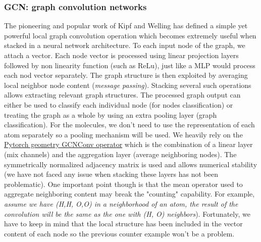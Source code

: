 \subsubsection{GCN: graph convolution networks}
\label{sec:GCN}

The pioneering and popular work of Kipf and Welling \cite{kipfwellinggcn} has defined a simple yet powerful local graph convolution operation which becomes extremely useful when stacked in a neural network architecture. To each input node of the graph, we attach a vector. Each node vector is processed using linear projection layers followed by non linearity function (such as ReLu), just like a MLP would process each nod vector separately. The graph structure is then exploited by averaging local neighbor node content (\textit{message passing}). Stacking several such operations allows extracting relevant graph structures. The processed graph output can either be used to classify each individual node (for nodes classification) or treating the graph as a whole by using an extra pooling layer (graph classification). For the molecules, we don't need to use the representation of each atom separately so a pooling mechanism will be used. We heavily rely on the \href{https://pytorch-geometric.readthedocs.io/en/latest/generated/torch_geometric.nn.conv.GCNConv.html}{Pytorch geometry GCNConv operator} which is the combination of a linear layer (mix channels) and the aggregation layer (average neighboring nodes). The symmetrically normalized adjacency matrix is used and allows numerical stability (we have not faced any issue when stacking these layers has not been problematic). One important point though is that the mean operator used to aggregate neighboring content may break the "counting" capability. For example, \textit{assume we have (H,H, O,O) in a neighborhood of an atom, the result of the convolution will be the same as the one with (H, O) neighbors}). Fortunately, we have to keep in mind that the local structure has been included in the vector content of each node so the previous counter example won't be a problem.
